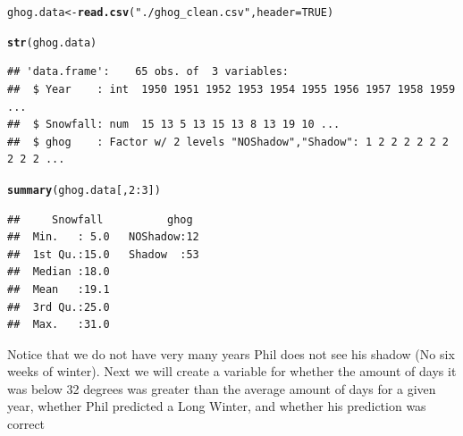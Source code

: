 \documentclass[12pt]{article}\usepackage[]{graphicx}\usepackage[]{color}
\makeatletter
\newcommand{\hlnum}[1]{\textcolor[rgb]{0.686,0.059,0.569}{#1}}%
\newcommand{\hlstr}[1]{\textcolor[rgb]{0.192,0.494,0.8}{#1}}%
\newcommand{\hlopt}[1]{\textcolor[rgb]{0,0,0}{#1}}%
\newcommand{\hlstd}[1]{\textcolor[rgb]{0.345,0.345,0.345}{#1}}%
\newcommand{\hlkwb}[1]{\textcolor[rgb]{0.69,0.353,0.396}{#1}}%
\newcommand{\hlkwc}[1]{\textcolor[rgb]{0.333,0.667,0.333}{#1}}%
\newcommand{\hlkwd}[1]{\textcolor[rgb]{0.737,0.353,0.396}{\textbf{#1}}}%
\newenvironment{kframe}{%
 \def\at@end@of@kframe{}%
 \ifinner\ifhmode%
  \def\at@end@of@kframe{\end{minipage}}%
  \begin{minipage}{\columnwidth}%
 \fi\fi%
 \def\FrameCommand##1{\hskip\@totalleftmargin \hskip-\fboxsep
 \colorbox{shadecolor}{##1}\hskip-\fboxsep
     \hskip-\linewidth \hskip-\@totalleftmargin \hskip\columnwidth}%
 \MakeFramed {\advance\hsize-\width
   \@totalleftmargin\z@ \linewidth\hsize
   \@setminipage}}%
 {\par\unskip\endMakeFramed%
 \at@end@of@kframe}
\newenvironment{knitrout}{}{} %
\makeatother
\begin{document}
\begin{knitrout}
\color{fgcolor}\begin{kframe}
\begin{alltt}
\hlstd{ghog.data}\hlkwb{<-}\hlkwd{read.csv}\hlstd{(}\hlstr{"./ghog_clean.csv"}\hlstd{,}\hlkwc{header}\hlstd{=}\hlnum{TRUE}\hlstd{)}

\hlkwd{str}\hlstd{(ghog.data)}
\end{alltt}
\begin{verbatim}
## 'data.frame':	65 obs. of  3 variables:
##  $ Year    : int  1950 1951 1952 1953 1954 1955 1956 1957 1958 1959 ...
##  $ Snowfall: num  15 13 5 13 15 13 8 13 19 10 ...
##  $ ghog    : Factor w/ 2 levels "NOShadow","Shadow": 1 2 2 2 2 2 2 2 2 2 ...
\end{verbatim}
\begin{alltt}
\hlkwd{summary}\hlstd{(ghog.data[,}\hlnum{2}\hlopt{:}\hlnum{3}\hlstd{])}
\end{alltt}
\begin{verbatim}
##     Snowfall          ghog   
##  Min.   : 5.0   NOShadow:12  
##  1st Qu.:15.0   Shadow  :53  
##  Median :18.0                
##  Mean   :19.1                
##  3rd Qu.:25.0                
##  Max.   :31.0
\end{verbatim}
\end{kframe}
\end{knitrout}
 
 Notice that we do not have very many years Phil does not see his shadow (No six weeks of winter). Next we will create a variable for whether the amount of days it was below 32 degrees was greater than the average amount of days for a given year, whether Phil predicted a Long Winter, and whether his prediction was correct
 
\end{document}
